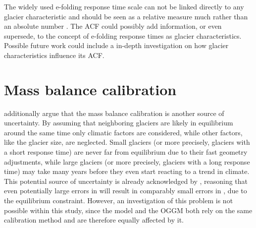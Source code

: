         The widely used e-folding response time scale can not be linked directly to any glacier characteristic and should be seen as a relative measure much rather than an absolute number \citep{Schuster2020}. The ACF could possibly add information, or even supersede, to the concept of e-folding response times as glacier characteristics.  Possible future work could include a in-depth investigation on how glacier characteristics influence its ACF.
 
    
    

    \section{Mass balance calibration} %
    \label{sec:mass_balance_calibration}

        \citet{Roe2020} additionally argue that the mass balance calibration is another source of uncertainty. By assuming that neighboring glaciers are likely in equilibrium around the same time only climatic factors are considered, while other factors, like the glacier size, are neglected. Small glaciers (or more precisely, glaciers with a short response time) are never far from equilibrium due to their fast geometry adjustments, while large glaciers (or more precisely, glaciers with a long response time) may take many years before they even start reacting to a trend in climate. This potential source of uncertainty is already acknowledged by \citet{Maussion2019}, reasoning that even potentially large errors in \tstar{} will result in comparably small errors in \mustar{}, due to the equilibrium constraint. However, an investigation of this problem is not possible within this study, since the \vas{} model and the OGGM both rely on the same calibration method and are therefore equally affected by it.

